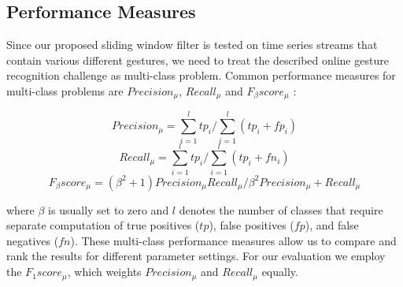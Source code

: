 \subsection{Performance Measures} \label{performance_measures}

Since our proposed sliding window filter is tested on time series streams that contain various different gestures, we need to treat the described online gesture recognition challenge as multi-class problem. 
Common performance measures for multi-class problems are $Precision_{\mu}$, $Recall_{\mu}$ and $F_{\beta}score_{\mu}$ \cite{sokolova2009systematic}:

\begin{equation}
    Precision_{\mu} = {\sum \limits_{i=1}^{l} tp_i}  \bigg/  {\sum \limits_{i=1}^{l} (tp_i + fp_i)}
\end{equation}
\begin{equation}
    Recall_{\mu} = {\sum \limits_{i=1}^{l} tp_i} \bigg/{\sum \limits_{i=1}^{l} (tp_i + fn_i)}
\end{equation}
\begin{equation}
    F_{\beta}score_{\mu} = {(\beta^2 + 1)Precision_{\mu} Recall_{\mu}} \bigg/ {\beta^2 Precision_{\mu} + Recall_{\mu}}
\end{equation}

where $\beta$ is usually set to zero and $l$ denotes the number of classes that require separate computation of true positives ($tp$), false positives ($fp$), and false negatives ($fn$).
These multi-class performance measures allow us to compare and rank the results for different parameter settings. 
For our evaluation we employ the $F_{1}score_{\mu}$, which weights $Precision_{\mu}$ and $Recall_{\mu}$ equally.
